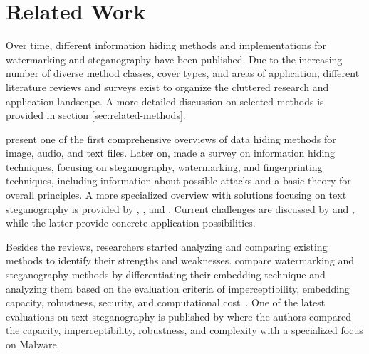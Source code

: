 \section{Related Work}
\label{sec:related-work}
	Over time, different information hiding methods and implementations for watermarking and steganography have been published. Due to the increasing number of diverse method classes, cover types, and areas of application, different literature reviews and surveys exist to organize the cluttered research and application landscape. A more detailed discussion on selected methods is provided in section \ref{sec:related-methods}.
	
	\citet{Bender.1996} present one of the first comprehensive overviews of data hiding methods for image, audio, and text files. Later on, \citet{Petitcolas.1999} made a survey on information hiding techniques, focusing on steganography, watermarking, and fingerprinting techniques, including information about possible attacks and a basic theory for overall principles. A more specialized overview with solutions focusing on text steganography is provided by \citet{Ahvanooey.2019}, \citet{Krishnan.2017}, and \citet{Majeed.2021}. Current challenges are discussed by \citet{Ahvanooey.2022} and \citet{Tyagi.2023}, while the latter provide concrete application possibilities.
	
	Besides the reviews, researchers started analyzing and comparing existing methods to identify their strengths and weaknesses. \citet{Ahvanooey.2018b} compare watermarking and steganography methods by differentiating their embedding technique and analyzing them based on the evaluation criteria of imperceptibility, embedding capacity, robustness, security, and computational cost~\citep{Ahvanooey.2018b}. One of the latest evaluations on text steganography is published by \citet{Knochel.2024} where the authors compared the capacity, imperceptibility, robustness, and complexity with a specialized focus on Malware.
	
